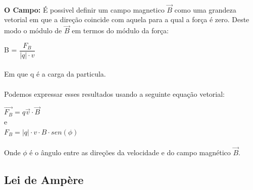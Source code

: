 \documentclass[a4paper, 12pt]{article}
\begin{document}
\paragraph{}\textbf{O Campo:} É possivel definir um campo magnetico $\overrightarrow{B}$ como uma grandeza vetorial em que a direção coincide com aquela para a qual a força é zero. Deste modo o módulo de $\overrightarrow{B}$ em termos do módulo da força:
\\
\begin{mdframed}[backgroundcolor=gray!20]
\begin{center}
	B = $\dfrac{F_B}{|q|\cdot v}$
			\end{center}
\end{mdframed}

\paragraph{}Em que q é a carga da particula.

\paragraph{}Podemos expressar esses resultados usando a seguinte equação vetorial: \\
\begin{mdframed}[backgroundcolor=gray!20]
\begin{center}
	$\overrightarrow{F_B} = q\overrightarrow{v} \cdot \overrightarrow{B}$
    \\e\\
    $F_B = |q| \cdot v \cdot B \cdot sen(\phi)$
			\end{center}
\end{mdframed}

\paragraph{}Onde $\phi$ é o ângulo entre as direções da velocidade e do campo magnético $\overrightarrow{B}$.

\subsection{Lei de Ampère}
\end{document}
